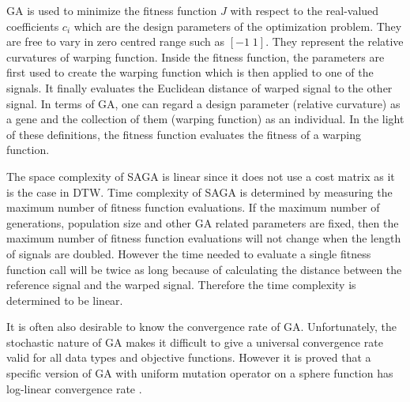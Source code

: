\documentclass[number,1p,12pt]{elsarticle}
\begin{document}
GA is used to minimize the fitness function $J$ with respect to the real-valued coefficients $c_i$ which are the design parameters of the optimization problem. They are free to vary in zero centred range such as $[-1\;1]$. They represent the relative curvatures of warping function. Inside the fitness function, the parameters are first used to create the warping function which is then applied to one of the signals. It finally evaluates the Euclidean distance of warped signal to the other signal. In terms of GA, one can regard a design parameter (relative curvature) as a gene and the collection of them (warping function) as an individual. In the light of these definitions, the fitness function evaluates the fitness of a warping function. 

The space complexity of SAGA is linear since it does not use a cost matrix as it is the case in DTW. Time complexity of SAGA is determined by measuring the maximum number of fitness function evaluations. If the maximum number of generations, population size and other GA related parameters are fixed, then the maximum number of fitness function evaluations will not change when the length of signals are doubled. However the time needed to evaluate a single fitness function call will be twice as long because of calculating the distance between the reference signal and the warped signal. Therefore the time complexity is determined to be linear.

It is often also desirable to know the convergence rate of GA. Unfortunately, the stochastic nature of GA makes it difficult to give a universal convergence rate valid for all data types and objective functions. However it is proved that a specific version of GA with uniform mutation operator on a sphere function has log-linear convergence rate \cite{Auger2005}.
\end{document}
